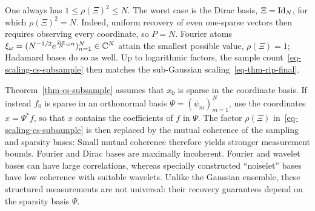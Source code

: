One always has $1 \leq \rho(\Xi)^2 \leq N$.
%
The worst case is the Dirac basis, $\Xi=\mathrm{Id}_N$, for which $\rho(\Xi)^2=N$. Indeed, uniform recovery of even one-sparse vectors then requires observing every coordinate, so $P=N$.
%
Fourier atoms $\xi_\omega = (N^{-1/2}e^{\frac{2\mathrm{i}\pi}{N}\omega n} )_{n=1}^N \in \mathbb{C}^N$ attain the smallest possible value, $\rho(\Xi)=1$; Hadamard bases do so as well. Up to logarithmic factors, the sample count~\eqref{eq-scaling-cs-subsample} then matches the sub-Gaussian scaling~\eqref{eq-thm-rip-final}.

Theorem~\ref{thm-cs-subsample} assumes that $x_0$ is sparse in the coordinate basis. If instead $f_0$ is sparse in an orthonormal basis $\Psi=(\psi_m)_{m=1}^N$, use the coordinates $x = \Psi^* f$, so that $x$ contains the coefficients of $f$ in $\Psi$. The factor $\rho(\Xi)$ in~\eqref{eq-scaling-cs-subsample} is then replaced by the mutual coherence of the sampling and sparsity bases:
Small mutual coherence therefore yields stronger measurement bounds. Fourier and Dirac bases are maximally incoherent. Fourier and wavelet bases can have large correlations, whereas specially constructed ``noiselet'' bases have low coherence with suitable wavelets.
%
Unlike the Gaussian ensemble, these structured measurements are not universal: their recovery guarantees depend on the sparsity basis $\Psi$.
